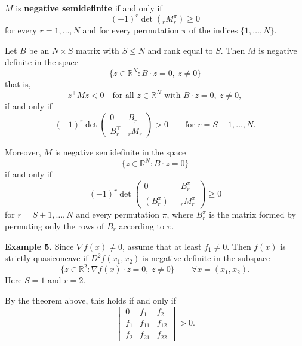 \vspace{1em}

$M$ is \textbf{negative semidefinite} if and only if
\[
(-1)^r \det({}_r M_r^\pi) \ge 0
\]
for every $r=1,\dots,N$ and for every permutation $\pi$ of the indices
$\{1,\dots,N\}$.



\vspace{1em}

Let $B$ be an $N \times S$ matrix with $S \le N$ and rank equal to $S$.
Then $M$ is negative definite in the space
\[
\{z \in \mathbb{R}^N : B \cdot z = 0,\ z \ne 0\}
\]
that is,
\[
z^\top M z < 0
\quad \text{for all } z \in \mathbb{R}^N \text{ with } B\cdot z = 0,\ z\ne 0,
\]
if and only if
\[
(-1)^r
\det
\begin{pmatrix}
0 & B_r \\
B_r^\top & {}_r M_r
\end{pmatrix}
> 0
\qquad \text{for } r=S+1,\dots,N.
\]

Moreover, $M$ is negative semidefinite in the space
\[
\{z \in \mathbb{R}^N : B\cdot z = 0\}
\]
if and only if
\[
(-1)^r
\det
\begin{pmatrix}
0 & B_r^\pi \\
(B_r^\pi)^\top & {}_r M_r^\pi
\end{pmatrix}
\ge 0
\]
for $r=S+1,\dots,N$ and every permutation $\pi$, where $B_r^\pi$
is the matrix formed by permuting only the rows of $B_r$ according to $\pi$.

\vspace{1em}

\textbf{Example 5.} Since $\nabla f(x)\ne 0$, assume that at least $f_1 \ne 0$.
Then $f(x)$ is strictly quasiconcave if $D^2 f(x_1,x_2)$ is negative definite
in the subspace
\[
\{z \in \mathbb{R}^2 : \nabla f(x)\cdot z = 0,\ z\ne 0\}
\qquad \forall x=(x_1,x_2).
\]
Here $S=1$ and $r=2$.

By the theorem above, this holds if and only if
\[
\begin{vmatrix}
0 & f_1 & f_2 \\
f_1 & f_{11} & f_{12} \\
f_2 & f_{21} & f_{22}
\end{vmatrix}
> 0.
\]

